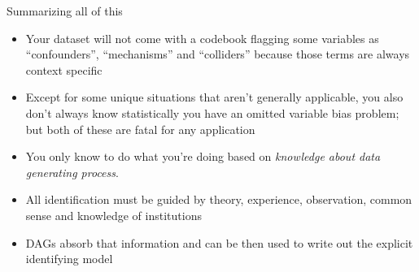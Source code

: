 \documentclass{beamer}
\begin{document}
\begin{frame}{Summarizing all of this}

  \begin{itemize}
    \item Your dataset will not come with a codebook flagging some variables as ``confounders'', ``mechanisms'' and ``colliders'' because those terms are always context specific
    \item Except for some unique situations that aren't generally applicable, you also don't always know statistically you have an omitted variable bias problem; but both of these are fatal for any application
    \item You only know to do what you're doing based on \emph{knowledge about data generating process}.
    \item All identification must be guided by theory, experience, observation, common sense and knowledge of institutions
    \item DAGs absorb that information and can be then used to write out the explicit identifying model
  \end{itemize}

\end{frame}
\end{document}
